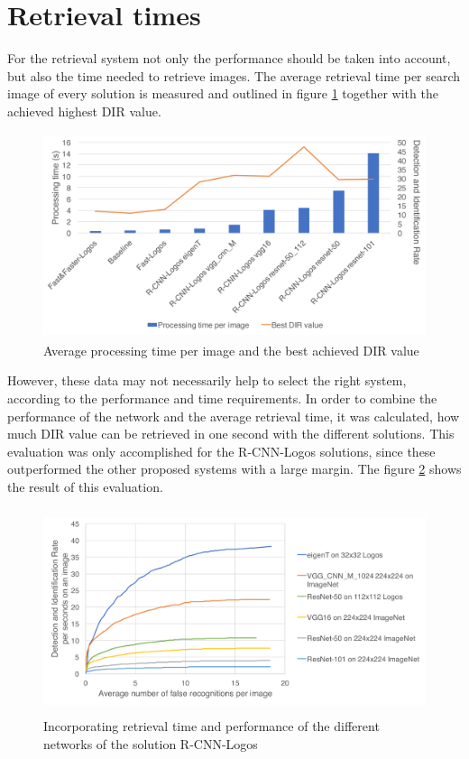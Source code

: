 \section{Retrieval times}
For the retrieval system not only the performance should be taken into account, but also the time needed to retrieve images. The average retrieval time per search image of every solution is measured and outlined in figure \ref{f:timebestdir} together with the achieved highest DIR value.
\begin{figure}
  \centering
  \includegraphics[height=60mm]{images/mt/timebestdir.pdf}
  \caption{Average processing time per image and the best achieved DIR value}
  \label{f:timebestdir}
\end{figure}
However, these data may not necessarily help to select the right system, according to the performance and time requirements. In order to combine the performance of the network and the average retrieval time, it was calculated, how much DIR value can be retrieved in one second with the different solutions. This evaluation was only accomplished for the R-CNN-Logos solutions, since these outperformed the other proposed systems with a large margin. The figure \ref{f:dirpertime} shows the result of this evaluation.
\begin{figure}
  \centering
  \includegraphics[height=60mm]{images/mt/dirpertime.pdf}
  \caption{Incorporating retrieval time and performance of the different networks of the solution R-CNN-Logos}
  \label{f:dirpertime}
\end{figure}